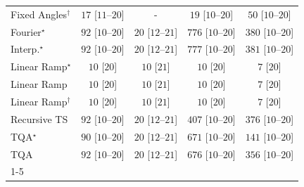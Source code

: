 \begin{tabular}{l|cccc|}
Fixed Angles$^\dagger$ & {\cellcolor[HTML]{F4FBF2}} \color[HTML]{000000} $17$ [$11$--$20$] & {\cellcolor[HTML]{000000}} \color[HTML]{F1F1F1} {\cellcolor{white}} \color{black} - & {\cellcolor[HTML]{F4FBF2}} \color[HTML]{000000} $19$ [$10$--$20$] & {\cellcolor[HTML]{EEF8EA}} \color[HTML]{000000} $50$ [$10$--$20$] \\
Fourier$^\star$ & {\cellcolor[HTML]{E6F5E1}} \color[HTML]{000000} $92$ [$10$--$20$] & {\cellcolor[HTML]{F4FBF1}} \color[HTML]{000000} $20$ [$12$--$21$] & {\cellcolor[HTML]{00441B}} \color[HTML]{F1F1F1} $776$ [$10$--$20$] & {\cellcolor[HTML]{78C679}} \color[HTML]{000000} $380$ [$10$--$20$] \\
Interp.$^\star$ & {\cellcolor[HTML]{E6F5E1}} \color[HTML]{000000} $92$ [$10$--$20$] & {\cellcolor[HTML]{F4FBF1}} \color[HTML]{000000} $20$ [$12$--$21$] & {\cellcolor[HTML]{00441B}} \color[HTML]{F1F1F1} $777$ [$10$--$20$] & {\cellcolor[HTML]{78C679}} \color[HTML]{000000} $381$ [$10$--$20$] \\
Linear Ramp$^\star$ & {\cellcolor[HTML]{F6FCF4}} \color[HTML]{000000} $10$ [$20$] & {\cellcolor[HTML]{F6FCF4}} \color[HTML]{000000} $10$ [$21$] & {\cellcolor[HTML]{F6FCF4}} \color[HTML]{000000} $10$ [$20$] & {\cellcolor[HTML]{F6FCF4}} \color[HTML]{000000} $7$ [$20$] \\
Linear Ramp & {\cellcolor[HTML]{F6FCF4}} \color[HTML]{000000} $10$ [$20$] & {\cellcolor[HTML]{F6FCF4}} \color[HTML]{000000} $10$ [$21$] & {\cellcolor[HTML]{F6FCF4}} \color[HTML]{000000} $10$ [$20$] & {\cellcolor[HTML]{F6FCF4}} \color[HTML]{000000} $7$ [$20$] \\
Linear Ramp$^\dagger$ & {\cellcolor[HTML]{F6FCF4}} \color[HTML]{000000} $10$ [$20$] & {\cellcolor[HTML]{F6FCF4}} \color[HTML]{000000} $10$ [$21$] & {\cellcolor[HTML]{F6FCF4}} \color[HTML]{000000} $10$ [$20$] & {\cellcolor[HTML]{F6FCF4}} \color[HTML]{000000} $7$ [$20$] \\
Recursive TS & {\cellcolor[HTML]{E6F5E1}} \color[HTML]{000000} $92$ [$10$--$20$] & {\cellcolor[HTML]{F4FBF1}} \color[HTML]{000000} $20$ [$12$--$21$] & {\cellcolor[HTML]{6BC072}} \color[HTML]{000000} $407$ [$10$--$20$] & {\cellcolor[HTML]{7AC77B}} \color[HTML]{000000} $376$ [$10$--$20$] \\
TQA$^\star$ & {\cellcolor[HTML]{E7F6E2}} \color[HTML]{000000} $90$ [$10$--$20$] & {\cellcolor[HTML]{F4FBF1}} \color[HTML]{000000} $20$ [$12$--$21$] & {\cellcolor[HTML]{026F2E}} \color[HTML]{F1F1F1} $671$ [$10$--$20$] & {\cellcolor[HTML]{D8F0D2}} \color[HTML]{000000} $141$ [$10$--$20$] \\
TQA & {\cellcolor[HTML]{E6F5E1}} \color[HTML]{000000} $92$ [$10$--$20$] & {\cellcolor[HTML]{F4FBF1}} \color[HTML]{000000} $20$ [$12$--$21$] & {\cellcolor[HTML]{016E2D}} \color[HTML]{F1F1F1} $676$ [$10$--$20$] & {\cellcolor[HTML]{83CB82}} \color[HTML]{000000} $356$ [$10$--$20$] \\
\cline{1-5}
\bottomrule
\end{tabular}
